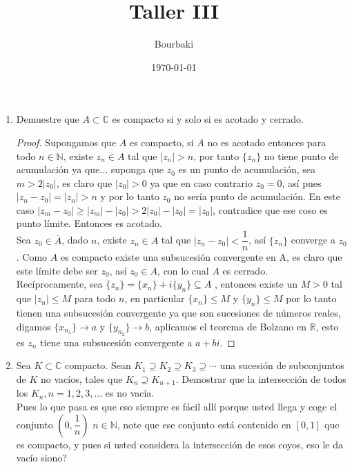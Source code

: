 \documentclass[11pt]{article}
\title{Taller III}
\author{Bourbaki}
\date{\today}
\begin{document}
\maketitle


\begin{enumerate}
    \item Demuestre que \( A \subset \mathbb{C} \) es compacto si y solo si es acotado y cerrado.

    \begin{proof}
    Supongamos que $A$ es compacto, si $A$ no es acotado entonces para todo $n\in \mathbb{N}$, existe $z_n\in A$ tal que $|z_n|>n$, por tanto $\{z_n\}$ no tiene punto de acumulación ya que... suponga que $z_0$ es un punto de acumulación, sea $m>2|z_0|$, es claro que $|z_0|>0$ ya que en caso contrario $z_0=0$, así pues $|z_n-z_0|=|z_n|>n$ y por lo tanto $z_0$ no sería punto de acumulación. En este caso $|z_m-z_0|\geq |z_m|-|z_0|>2|z_0|-|z_0|=|z_0|$, contradice que ese coso es punto límite. Entonces es acotado.\\

    Sea $z_0\in \overline{A}$, dado $n$, existe $z_n\in A$ tal que $|z_n-z_0|<\dfrac{1}{n}$, así $\{z_n\}$ converge a $z_0$. Como $A$ es compacto existe una subsucesión convergente en A, es claro que este límite debe ser $z_0$, así $z_0\in A$, con lo cual $A$ es cerrado.\\

    Recíprocamente, sea $\{z_n\}=\{x_n\}+i\{y_n\}\subseteq A$ , entonces existe un $M>0$ tal que $|z_n|\leq M$ para todo $n$, en particular $\{x_n\}\leq M$ y $\{y_n\}\leq M$ por lo tanto tienen una subsucesión convergente ya que son sucesiones de números reales, digamos $\{x_{n_1}\}\to a$ y $\{y_{n_2}\}\to b$, aplicamos el teorema de Bolzano en $\mathbb{R}$, esto es $z_n$ tiene una subsucesión convergente a $a+bi$.
    \end{proof}

    \item Sea \( K \subset \mathbb{C} \) compacto. Sean \( K_1 \supseteq K_2 \supseteq K_3 \supseteq \cdots \) una sucesión de subconjuntos de \( K \) no vacíos, tales que \( K_n \supseteq K_{n+1} \). Demostrar que la intersección de todos los \( K_n, n = 1, 2, 3, \ldots \) es no vacía.\\

    Pues lo que pasa es que eso siempre es  fácil allí porque usted llega y coge el conjunto $\left(0,\dfrac{1}{n}\right)$ $n\in \mathbb{N}$, note que ese conjunto está contenido en $[0,1]$ que es compacto, y pues si usted considera la intersección de esos coyos, eso le da vacío siono?


\end{enumerate}
\end{document}
